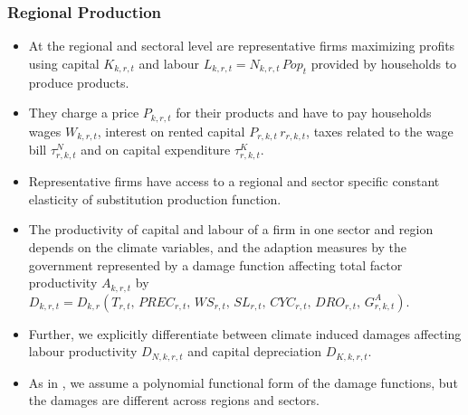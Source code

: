 \documentclass[11pt,aspectratio=169]{beamer}
\begin{document}
\begin{frame}
\frametitle{Regional Production}
\scriptsize
\begin{itemize}
\item At the regional and sectoral level are representative firms maximizing profits using capital $K_{k,r,t}$ and labour $L_{k,r,t} = N_{k,r,t} \, Pop_{t}$ provided by households to produce products. 
\item They charge a price $P_{k,r,t}$ for their products and have to pay households wages $W_{k,r,t}$, interest on rented capital $P_{r,k,t} \, r_{r,k,t}$, taxes related to the wage bill $\tau^{N}_{r,k,t}$ and on capital expenditure $\tau^{K}_{r,k,t}$.
\item Representative firms have access to a regional and sector specific constant elasticity of substitution production function.
\item The productivity of capital and labour of a firm in one sector and region depends on the climate variables, and the adaption measures by the government represented by a damage function affecting total factor productivity $A_{k,r,t}$ by $D_{k,r,t} = D_{k,r}\left(T_{r,t}, \, PREC_{r,t}, \, WS_{r,t}, \, SL_{r,t}, \, CYC_{r,t}, \, DRO_{r,t}, \, G^{A}_{r,k,t} \right)$.
\item Further, we explicitly differentiate between climate induced damages affecting labour productivity $D_{N,k,r,t}$ and capital depreciation $D_{K,k,r,t}$. 
\item As in \cite{nordhaus1993optimal}, we assume a polynomial functional form of the damage functions, but the damages are different across regions and sectors.
\end{itemize}
\end{frame}
\end{document}
